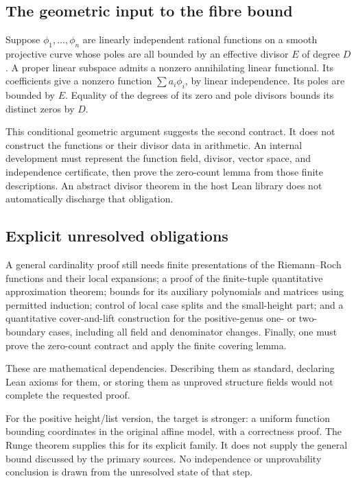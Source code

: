\subsection{The geometric input to the fibre bound}

Suppose $\phi_1,\ldots,\phi_n$ are linearly independent rational
functions on a smooth projective curve whose poles are all bounded
by an effective divisor $E$ of degree $D$. A proper linear
subspace admits a nonzero annihilating linear functional. Its
coefficients give a nonzero function $\sum a_i\phi_i$, by linear
independence. Its poles are bounded by $E$. Equality of the degrees
of its zero and pole divisors bounds its distinct zeros by $D$.

This conditional geometric argument suggests the second contract.
It does not construct the functions or their divisor data in arithmetic.
An internal development must represent the function field, divisor,
vector space, and independence certificate, then prove the zero-count
lemma from those finite descriptions. An abstract divisor theorem in
the host Lean library does not automatically discharge that obligation.

\subsection{Explicit unresolved obligations}

A general cardinality proof still needs finite presentations of the
Riemann--Roch functions and their local expansions; a proof of the
finite-tuple quantitative approximation theorem; bounds for its
auxiliary polynomials and matrices using permitted induction; control
of local case splits and the small-height part; and a quantitative
cover-and-lift construction for the positive-genus one- or two-boundary
cases, including all field and denominator changes. Finally, one must
prove the zero-count contract and apply the finite covering lemma.

These are mathematical dependencies. Describing them as standard,
declaring Lean axioms for them, or storing them as unproved structure
fields would not complete the requested proof.

For the positive height/list version, the target is stronger: a
uniform function bounding coordinates in the original affine model,
with a correctness proof. The Runge theorem supplies this for its
explicit family. It does not supply the general bound discussed by
the primary sources. No independence or unprovability conclusion is
drawn from the unresolved state of that step.


